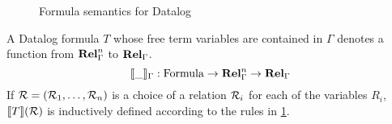 \begin{figure}
  \caption{Formula semantics for Datalog}
  \label{fig:datalogSemantics}
  \vspace{-12pt}
\end{figure}

\begin{defn}
  A Datalog formula $T$ whose free term variables are contained in $\Gamma$ denotes a function from 
  $\mathbf{Rel}_\Gamma^n$ to $\mathbf{Rel}_\Gamma$.
  \begin{displaymath}
    \llbracket \_ \rrbracket_\Gamma : \mathrm{Formula} \rightarrow \mathbf{Rel}_\Gamma^n \rightarrow \mathbf{Rel}_\Gamma
  \end{displaymath}
  If $\mathcal{R} = (\mathcal{R}_1, \ldots, \mathcal{R}_n)$ is a choice of a relation $\mathcal{R}_i$ for each of the variables $R_i$,
  $\llbracket T \rrbracket(\mathcal{R})$ is inductively defined according to the rules in \cref{fig:datalogSemantics}.
\end{defn}

